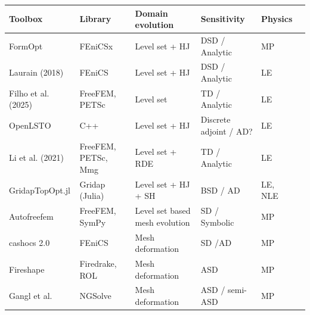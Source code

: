 \documentclass[preprint,9pt]{elsarticle}
\begin{document}


\begin{table}[h]
	\centering
	\footnotesize
	\begin{tabularx}{\textwidth}{l l l l l l}
	\toprule
	\textbf{Toolbox} & \textbf{Library} & \textbf{Domain evolution} & \textbf{Sensitivity} & \textbf{Physics} \\
	\midrule
	
	FormOpt 
	& FEniCSx 
	& Level set + HJ
	& DSD / Analytic
	& MP \\
	
	Laurain (2018) \cite{MR3843884} 
	& FEniCS 		
	& Level set + HJ
	& DSD  / Analytic
	& LE \\
	
	
	Filho et al. (2025) \cite{MR4916810} 
	& FreeFEM, PETSc 		
	& Level set
	& TD  / Analytic
	& LE \\

	OpenLSTO \cite{Kambampati2018}
	& C++ 
	& Level set + HJ
	& Discrete adjoint / AD? 
	&  LE\\
	
	Li et al. (2021) \cite{LI2021103561} 
	& FreeFEM, PETSc, Mmg 		
	& Level set + RDE 
	& TD / Analytic
	& LE \\
	
	GridapTopOpt.jl \cite{Wegert2025} 
	& Gridap (Julia) 		
	& Level set + HJ + SH
	& BSD / AD
	& LE, NLE \\

	Autofreefem \cite{Allaire2024} 
	& FreeFEM, SymPy 	
	& Level set based mesh evolution
	& SD / Symbolic
	& MP \\
	
	cashocs 2.0 \cite{BLAUTH2021100646,BLAUTH2023101577} 
	& FEniCS 
	& Mesh deformation 
	& SD /AD
	& MP \\
	
	
	Fireshape \cite{MR4244971}
	& Firedrake, ROL 	 
	& Mesh deformation 
	& ASD 
	& MP \\
	
	Gangl et al. \cite{MR4233697} 
	& NGSolve 	
	& Mesh deformation 
	& ASD / semi-ASD 
	& MP \\
	

\end{tabularx}
\end{table}
\end{document}
